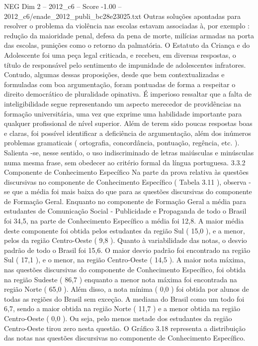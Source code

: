 \begin{textsample}{NEG Dim 2 – 2012\_c6 – Score -1.00 – 2012\_c6/enade\_2012\_publi\_bc28e23025.txt}
Outras soluções apontadas para resolver o problema da violência nas escolas estavam associadas à, por exemplo : redução da maioridade penal, defesa da pena de morte, milícias armadas na porta das escolas, punições como o retorno da palmatória.
O Estatuto da Criança e do Adolescente foi uma peça legal criticada, e recebeu, em diversas respostas, o título de responsável pelo sentimento de impunidade de adolescentes infratores.
Contudo, algumas dessas proposições, desde que bem contextualizadas e formuladas com boa argumentação, foram pontuadas de forma a respeitar o direito democrático de pluralidade opinativa.
É imperioso ressaltar que a falta de inteligibilidade segue representando um aspecto merecedor de providências na formação universitária, uma vez que exprime uma habilidade importante para qualquer profissional de nível superior.
Além de terem sido poucas respostas boas e claras, foi possível identificar a deficiência de argumentação, além dos inúmeros problemas gramaticais ( ortografia, concordância, pontuação, regência, etc. ).
Salienta -se, nesse sentido, o uso indiscriminado de letras maiúsculas e minúsculas numa mesma frase, sem obedecer ao critério formal da língua portuguesa. 3.3.2 Componente de Conhecimento Específico Na parte da prova relativa às questões discursivas no componente de Conhecimento Específico ( Tabela 3.11 ), observa -se que a média foi mais baixa do que para as questões discursivas do componente de Formação Geral.
Enquanto no componente de Formação Geral a média para estudantes de Comunicação Social - Publicidade e Propaganda de todo o Brasil foi 34,5, na parte de Conhecimento Específico a média foi 12,8.
A maior média deste componente foi obtida pelos estudantes da região Sul ( 15,0 ), e a menor, pelos da região Centro-Oeste ( 9,8 ).
Quanto à variabilidade das notas, o desvio padrão de todo o Brasil foi 15,6.
O maior desvio padrão foi encontrado na região Sul ( 17,1 ), e o menor, na região Centro-Oeste ( 14,5 ).
A maior nota máxima, nas questões discursivas do componente de Conhecimento Específico, foi obtida na região Sudeste ( 86,7 ) enquanto a menor nota máxima foi encontrada na região Norte ( 65,0 ).
Além disso, a nota mínima ( 0,0 ) foi obtida por alunos de todas as regiões do Brasil sem exceção.
A mediana do Brasil como um todo foi 6,7, sendo a maior obtida na região Norte ( 11,7 ) e a menor obtida na região Centro-Oeste ( 0,0 ).
Ou seja, pelo menos metade dos estudantes da região Centro-Oeste tirou zero nesta questão.
O Gráfico 3.18 representa a distribuição das notas nas questões discursivas no componente de Conhecimento Específico.

\end{textsample}

